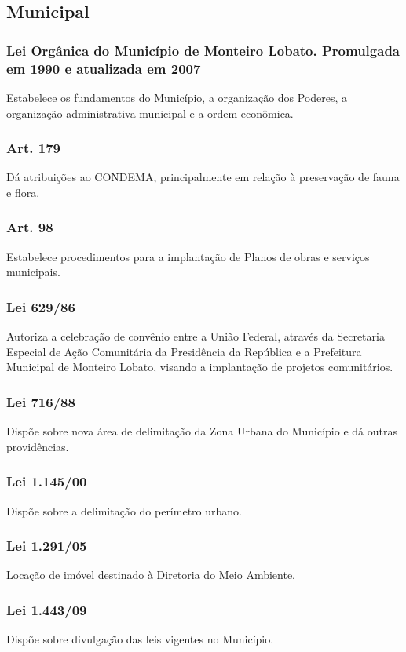 \begin{subapend}
	\subsection{Municipal}
	\begin{subsubapend}
		\item \subsubsection{Lei Orgânica do Município de Monteiro Lobato. Promulgada em 1990 e atualizada em 2007}
		Estabelece os fundamentos do Município, a organização dos Poderes, a organização administrativa municipal e a ordem econômica.
		\subsubsection{Art. 179} 
		Dá atribuições ao CONDEMA, principalmente em relação à preservação de fauna e flora.
		\subsubsection{Art. 98}
		Estabelece procedimentos para a implantação de Planos de obras e serviços municipais.
		\subsubsection{Lei 629/86}
		Autoriza a celebração de convênio entre a União Federal, através da Secretaria Especial de Ação Comunitária da Presidência da República e a Prefeitura Municipal de Monteiro Lobato, visando a implantação de projetos comunitários.
		\subsubsection{Lei 716/88}
		Dispõe sobre nova área de delimitação da Zona Urbana do Município e dá outras providências.
		\subsubsection{Lei 1.145/00}
		Dispõe sobre a delimitação do perímetro urbano.
		\subsubsection{Lei 1.291/05}
		Locação de imóvel destinado à Diretoria do Meio Ambiente.
		\subsubsection{Lei 1.443/09}
		Dispõe sobre divulgação das leis vigentes no Município.

\end{subsubapend}
\end{subapend}

